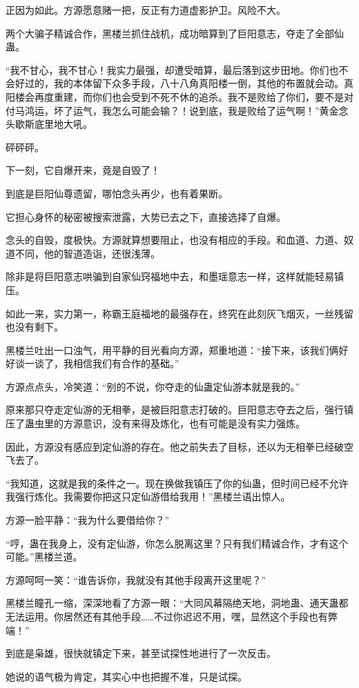 \begin{this_body}
正因为如此。方源愿意赌一把，反正有力道虚影护卫。风险不大。

两个大骗子精诚合作，黑楼兰抓住战机，成功暗算到了巨阳意志，夺走了全部仙蛊。

“我不甘心，我不甘心！我实力最强，却遭受暗算，最后落到这步田地。你们也不会好过的，我的本体留下众多手段，八十八角真阳楼一倒，其他的布置就会动。真阳楼会再度重建，而你们也会受到不死不休的追杀。我不是败给了你们，要不是对付马鸿运，坏了运气，我怎么可能会输？！说到底，我是败给了运气啊！”黄金念头歇斯底里地大吼。

砰砰砰。

下一刻，它自爆开来，竟是自毁了！

到底是巨阳仙尊遗留，哪怕念头再少，也有着果断。

它担心身怀的秘密被搜索泄露，大势已去之下，直接选择了自爆。

念头的自毁，度极快。方源就算想要阻止，也没有相应的手段。和血道、力道、奴道不同，他的智道造诣，还很浅薄。

除非是将巨阳意志哄骗到自家仙窍福地中去，和墨瑶意志一样，这样就能轻易镇压。

如此一来，实力第一，称霸王庭福地的最强存在，终究在此刻灰飞烟灭，一丝残留也没有剩下。

黑楼兰吐出一口浊气，用平静的目光看向方源，郑重地道：“接下来，该我们俩好好谈一谈了，我相信我们有合作的基础。”

方源点点头，冷笑道：“别的不说，你夺走的仙蛊定仙游本就是我的。”

原来那只夺走定仙游的无相拳，是被巨阳意志打破的。巨阳意志夺去之后，强行镇压了蛊虫里的方源意识，没有来得及炼化，也有可能是没有实力强炼。

因此，方源没有感应到定仙游的存在。他之前失去了目标，还以为无相拳已经破空飞去了。

“我知道，这就是我的条件之一。现在换做我镇压了你的仙蛊，但时间已经不允许我强行炼化。我需要你把这只定仙游借给我用！”黑楼兰语出惊人。

方源一脸平静：“我为什么要借给你？”

“哼，蛊在我身上，没有定仙游，你怎么脱离这里？只有我们精诚合作，才有这个可能。”黑楼兰道。

方源呵呵一笑：“谁告诉你，我就没有其他手段离开这里呢？”

黑楼兰瞳孔一缩，深深地看了方源一眼：“大同风幕隔绝天地，洞地蛊、通天蛊都无法运用。你居然还有其他手段……不过你迟迟不用，嘿，显然这个手段也有弊端！”

到底是枭雄，很快就镇定下来，甚至试探性地进行了一次反击。

她说的语气极为肯定，其实心中也把握不准，只是试探。


\end{this_body}
